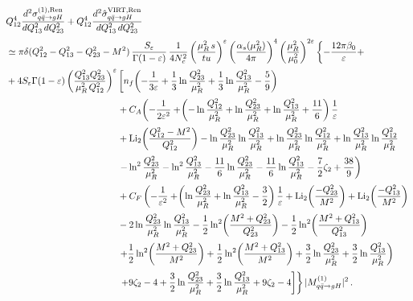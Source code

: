 \begin{equation}
\begin{aligned}
\label{eq:LO+virt-ren}
  &Q_{12}^4\frac{d^2\sigma_{q\bar{q}\to g H}^{(1),\rm Ren}}{dQ_{13}^2\,dQ_{23}^2}
  +Q_{12}^4\frac{d^2\hat\sigma_{q\bar{q}\to g H}^{\rm VIRT,Ren}}{dQ_{13}^2\,dQ_{23}^2}\\[0.5ex]
 &\simeq  \pi\delta(Q_{12}^2-Q_{13}^2-Q_{23}^2-M^2)\,
  \frac{S_\varepsilon}{\Gamma(1-\varepsilon)}
  \,\frac{1}{4N_c^2}
  \left(\frac{\mu_R^2\,s}{tu}\right)^\varepsilon
\left(\frac{\alpha_s(\mu_R^2)}{4\pi}\right)^4
\left(\frac{\mu_R^2}{\mu_0^2}\right)^{2\varepsilon}\left\{-\frac{12 \pi \beta_0}{\varepsilon}+\right.\\[0.5ex]
&+4 S_{\varepsilon}\Gamma(1-\varepsilon)
  \left(\frac{Q_{13}^2 Q_{23}^2}{\mu_R^2\,Q_{12}^2}\right)^\varepsilon \left[ n_f\!\left(-\frac{1}{3\varepsilon}
  +\frac{1}{3}\ln\frac{Q_{23}^2}{\mu_R^2}
  +\frac{1}{3}\ln\frac{Q_{13}^2}{\mu_R^2}
  -\frac{5}{9}\right) \right.\\[0.5ex]
   &\qquad\qquad\qquad\qquad\qquad\qquad+C_A\!\left(-\frac{1}{2\varepsilon^2}
  +\!\left(-\ln\frac{Q_{12}^2}{\mu_R^2}
  +\ln\frac{Q_{23}^2}{\mu_R^2}
  +\ln\frac{Q_{13}^2}{\mu_R^2}
  +\frac{11}{6}\right)\frac{1}{\varepsilon}\right.\\[0.5ex]
  &\qquad\qquad\qquad\qquad\qquad\qquad+\operatorname{Li}_2\!\left(
  \frac{Q_{12}^2-M^2}{Q_{12}^2}\right)
  -\ln\frac{Q_{23}^2}{\mu_R^2}\ln\frac{Q_{13}^2}{\mu_R^2}
  +\ln\frac{Q_{23}^2}{\mu_R^2}\ln\frac{Q_{12}^2}{\mu_R^2}
  +\ln\frac{Q_{13}^2}{\mu_R^2}\ln\frac{Q_{12}^2}{\mu_R^2}\\[0.5ex]
  &\qquad\qquad\qquad\qquad\qquad\qquad\left.-\ln^2\frac{Q_{23}^2}{\mu_R^2}
  -\ln^2\frac{Q_{13}^2}{\mu_R^2}
  -\frac{11}{6}\ln\frac{Q_{23}^2}{\mu_R^2}
  -\frac{11}{6}\ln\frac{Q_{13}^2}{\mu_R^2}
  -\frac{7}{2}\zeta_2+\frac{38}{9}\right)\\[0.5ex]
  &\qquad\qquad\qquad\qquad\qquad\qquad+C_F\left(-\frac{1}{\varepsilon^2}
  +\!\left(\ln\frac{Q_{23}^2}{\mu_R^2}
  +\ln\frac{Q_{13}^2}{\mu_R^2}-\frac{3}{2}\right)\frac{1}{\varepsilon}
  +\operatorname{Li}_2\!\left(\frac{-Q_{23}^2}{M^2}\right)
  +\operatorname{Li}_2\!\left(\frac{-Q_{13}^2}{M^2}\right)\right.\\[0.5ex]
  &\qquad\qquad\qquad\qquad\qquad\qquad-2\ln\frac{Q_{23}^2}{\mu_R^2}\ln\frac{Q_{13}^2}{\mu_R^2}
  -\frac{1}{2}\ln^2\!\left(\frac{M^2+Q_{23}^2}{Q_{23}^2}\right)
  -\frac{1}{2}\ln^2\!\left(\frac{M^2+Q_{13}^2}{Q_{13}^2}\right)\\[0.5ex]
  &\qquad\qquad\qquad\qquad\qquad\qquad\left.+\frac{1}{2}\ln^2\!\left(\frac{M^2+Q_{23}^2}{M^2}\right)
  +\frac{1}{2}\ln^2\!\left(\frac{M^2+Q_{13}^2}{M^2}\right)
  +\frac{3}{2}\ln\frac{Q_{23}^2}{\mu_R^2}
  +\frac{3}{2}\ln\frac{Q_{13}^2}{\mu_R^2}\right)\\[0.5ex]
  &\qquad\qquad\qquad\qquad\qquad\qquad\left.\left.+9\zeta_2-4+\frac{3}{2}\ln\frac{Q_{23}^2}{\mu_R^2}
  +\frac{3}{2}\ln\frac{Q_{13}^2}{\mu_R^2}
  +9\zeta_2-4\right]\right\}|M^{(1)}_{q\bar{q}\to g H}|^2\,.
\end{aligned}
\end{equation}
